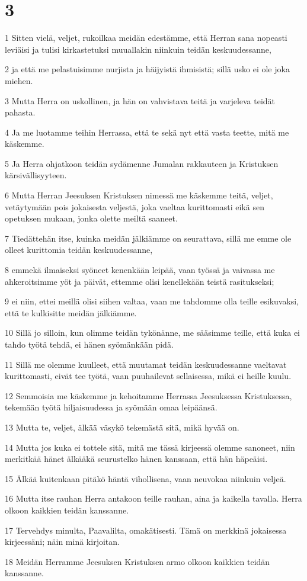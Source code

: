 \chapter{3}

\par 1 Sitten vielä, veljet, rukoilkaa meidän edestämme, että Herran sana nopeasti leviäisi ja tulisi kirkastetuksi muuallakin niinkuin teidän keskuudessanne,
\par 2 ja että me pelastuisimme nurjista ja häijyistä ihmisistä; sillä usko ei ole joka miehen.
\par 3 Mutta Herra on uskollinen, ja hän on vahvistava teitä ja varjeleva teidät pahasta.
\par 4 Ja me luotamme teihin Herrassa, että te sekä nyt että vasta teette, mitä me käskemme.
\par 5 Ja Herra ohjatkoon teidän sydämenne Jumalan rakkauteen ja Kristuksen kärsivällisyyteen.
\par 6 Mutta Herran Jeesuksen Kristuksen nimessä me käskemme teitä, veljet, vetäytymään pois jokaisesta veljestä, joka vaeltaa kurittomasti eikä sen opetuksen mukaan, jonka olette meiltä saaneet.
\par 7 Tiedättehän itse, kuinka meidän jälkiämme on seurattava, sillä me emme ole olleet kurittomia teidän keskuudessanne,
\par 8 emmekä ilmaiseksi syöneet kenenkään leipää, vaan työssä ja vaivassa me ahkeroitsimme yöt ja päivät, ettemme olisi kenellekään teistä rasitukseksi;
\par 9 ei niin, ettei meillä olisi siihen valtaa, vaan me tahdomme olla teille esikuvaksi, että te kulkisitte meidän jälkiämme.
\par 10 Sillä jo silloin, kun olimme teidän tykönänne, me sääsimme teille, että kuka ei tahdo työtä tehdä, ei hänen syömänkään pidä.
\par 11 Sillä me olemme kuulleet, että muutamat teidän keskuudessanne vaeltavat kurittomasti, eivät tee työtä, vaan puuhailevat sellaisessa, mikä ei heille kuulu.
\par 12 Semmoisia me käskemme ja kehoitamme Herrassa Jeesuksessa Kristuksessa, tekemään työtä hiljaisuudessa ja syömään omaa leipäänsä.
\par 13 Mutta te, veljet, älkää väsykö tekemästä sitä, mikä hyvää on.
\par 14 Mutta jos kuka ei tottele sitä, mitä me tässä kirjeessä olemme sanoneet, niin merkitkää hänet älkääkä seurustelko hänen kanssaan, että hän häpeäisi.
\par 15 Älkää kuitenkaan pitäkö häntä vihollisena, vaan neuvokaa niinkuin veljeä.
\par 16 Mutta itse rauhan Herra antakoon teille rauhan, aina ja kaikella tavalla. Herra olkoon kaikkien teidän kanssanne.
\par 17 Tervehdys minulta, Paavalilta, omakätisesti. Tämä on merkkinä jokaisessa kirjeessäni; näin minä kirjoitan.
\par 18 Meidän Herramme Jeesuksen Kristuksen armo olkoon kaikkien teidän kanssanne.


